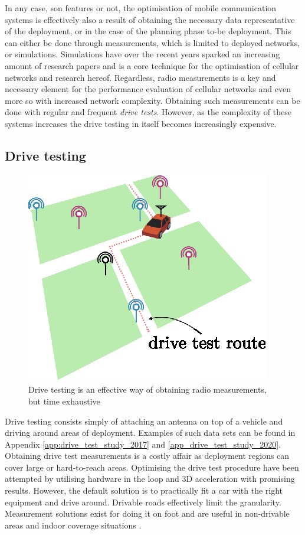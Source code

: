 In any case, \gls{son} features or not, the optimisation of mobile communication systems is effectively also a result of obtaining the necessary data representative of the deployment, or in the case of the planning phase to-be deployment. This can either be done through measurements, which is limited to deployed networks, or simulations. Simulations have over the recent years sparked an increasing amount of research papers and is a core technique for the optimisation of cellular networks and research hereof. Regardless, radio measurements is a key and necessary element for the performance evaluation of cellular networks and even more so with increased network complexity. Obtaining such measurements can be done with regular and frequent \emph{drive tests}. However, as the complexity of these systems increases the drive testing in itself becomes increasingly expensive. 

\subsection{Drive testing}\label{sec:drive_testing}

\begin{figure}
    \centering
    \includegraphics[width=.5\textwidth]{chapters/figures/drive_test_illustration.eps}
    \caption{Drive testing is an effective way of obtaining radio measurements, but time exhaustive}
    \label{fig:my_label}
\end{figure}


Drive testing consists simply of attaching an antenna on top of a vehicle and driving around areas of deployment. Examples of such data sets can be found in Appendix \ref{app:drive_test_study_2017} and \ref{app_drive_test_study_2020}. Obtaining drive test measurements is a costly affair as deployment regions can cover large or hard-to-reach areas. Optimising the drive test procedure have been attempted by utilising hardware in the loop and 3D acceleration \cite{Charitos2017} with promising results. However, the default solution is to practically fit a car with the right equipment and drive around. Drivable roads effectively limit the granularity. Measurement solutions exist for doing it on foot and are useful in non-drivable areas and indoor coverage situations \cite{ROMESmanual}. 

